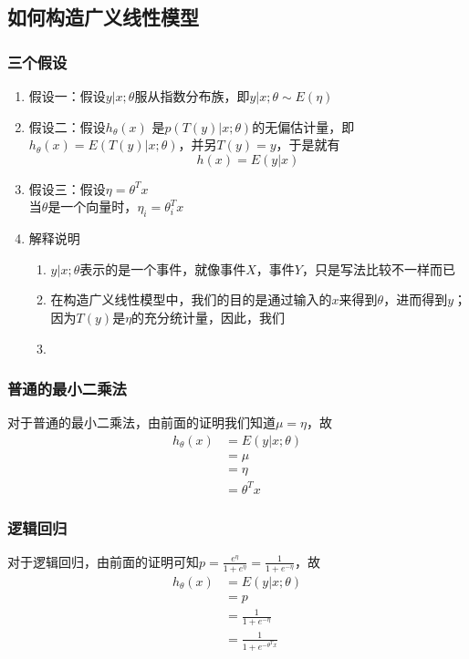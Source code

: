 \subsection{如何构造广义线性模型}
\subsubsection{三个假设}
\begin{enumerate}
	\item 假设一：假设$y|x; \theta$服从指数分布族，即$y|x; \theta \sim E(\eta)$
	\item 假设二：假设$h_\theta(x)$ 是$p\left(T(y)|x; \theta\right)$的无偏估计量，即$h_\theta(x)=E\left(T(y)|x; \theta\right)$，并另$T(y)=y$，于是就有
	\begin{equation}
		h(x) = E(y|x)
	\end{equation}
	{\color{red}{对此条假设还待更进一步的理解}}
	\item 假设三：假设$\eta = \theta^Tx$ \\
	当$\theta$是一个向量时，$\eta_i = \theta_i^Tx$
	\item 解释说明
	\begin{enumerate}
		\item $y|x; \theta$表示的是一个事件，就像事件$X$，事件$Y$，只是写法比较不一样而已
		\item 在构造广义线性模型中，我们的目的是通过输入的$x$来得到$\theta$，进而得到$y$；因为$T(y)$是$\eta$的充分统计量，因此，我们
		\item 
	\end{enumerate}
\end{enumerate}

\subsubsection{普通的最小二乘法}
对于普通的最小二乘法，由前面的证明我们知道$\mu = \eta$，故
\begin{equation}\begin{aligned}
	h_\theta(x) &= E(y|x;\theta) \\
	&= \mu \\
	&= \eta \\
	&= \theta^T x
\end{aligned}\end{equation}

\subsubsection{逻辑回归}
对于逻辑回归，由前面的证明可知$p=\frac{e^{\eta}}{1+e^{\eta}} = \frac{1}{1+e^{-\eta}}$，故
\begin{equation}\begin{aligned}
	h_\theta(x) &= E(y|x; \theta) \\
	&= p \\
	&= \frac{1}{1+e^{-\eta}} \\
	&= \frac{1}{1+e^{-\theta^Tx}}
\end{aligned}\end{equation}


